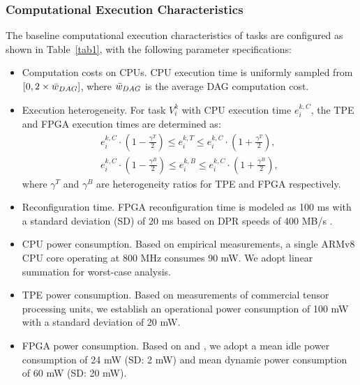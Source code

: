 \documentclass{IEEEtaes}
\begin{document}
\subsubsection{Computational Execution Characteristics}The baseline computational execution characteristics of tasks are configured as shown in Table~\ref{tab1}, with the following parameter specifications:
\begin{itemize}
    \item{Computation costs on CPUs. CPU execution time is uniformly sampled from $[0,2\times \Bar{w}_{DAG}]$, where $\Bar{w}_{DAG}$ is the average DAG computation cost.}
    \item{Execution heterogeneity. For task $V_i^k$ with CPU execution time $e_{i}^{k,C}$, the TPE and FPGA execution times are determined as:
    \begin{align}
        e_{i}^{k,C}\cdot (1-\frac{\gamma^T}{2})\leq e_{i}^{k,T} \leq e_{i}^{k,C}\cdot (1+\frac{\gamma^T}{2}),\\
        e_{i}^{k,C}\cdot (1-\frac{\gamma^B}{2})\leq e_{i}^{k,B} \leq e_{i}^{k,C}\cdot (1+\frac{\gamma^B}{2}),
    \end{align}
    where $\gamma^T$ and $\gamma^B$ are heterogeneity ratios for TPE and FPGA respectively.}
    \item{Reconfiguration time. FPGA reconfiguration time is modeled as 100 ms with a standard deviation (SD) of 20 ms based on DPR speeds of 400 MB/s \cite{b6}.}
    \item{CPU power consumption. Based on empirical measurements, a single ARMv8 CPU core operating at 800 MHz consumes 90 mW. We adopt linear summation for worst-case analysis.}
    \item{TPE power consumption. Based on measurements of commercial tensor processing units, we establish an operational power consumption of 100 mW with a standard deviation of 20 mW.}
    \item{FPGA power consumption. Based on \cite{b7} and \cite{b4}, we adopt a mean idle power consumption of 24 mW (SD: 2 mW) and mean dynamic power consumption of 60 mW (SD: 20 mW).}
\end{itemize}
\end{document}
